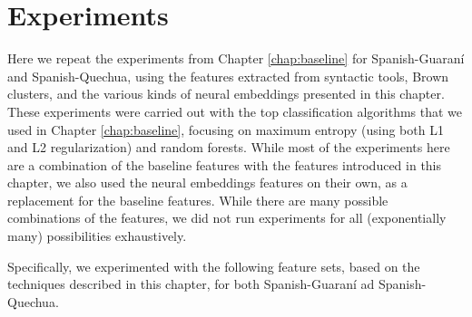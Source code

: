 \section{Experiments}
\label{sec:monolingual-experiments}
Here we repeat the experiments from Chapter \ref{chap:baseline} for
Spanish-Guaraní and Spanish-Quechua, using the features extracted from
syntactic tools, Brown clusters, and the various kinds of neural embeddings
presented in this chapter.
These experiments were carried out with the top classification algorithms that
we used in Chapter \ref{chap:baseline}, focusing on maximum entropy (using both
L1 and L2 regularization) and random forests. While most of the experiments
here are a combination of the baseline features with the features introduced in
this chapter, we also used the neural embeddings features on their own,
as a replacement for the baseline features. While there are many possible
combinations of the features, we did not run experiments for all (exponentially
many) possibilities exhaustively.

Specifically, we experimented with the following feature sets, based on the
techniques described in this chapter, for both Spanish-Guaraní ad
Spanish-Quechua.

